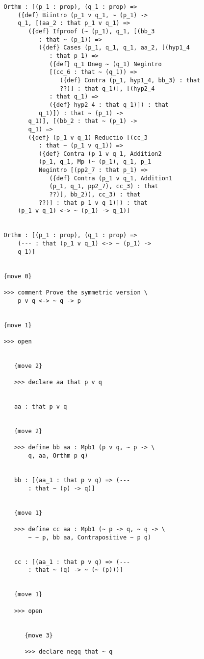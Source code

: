 \documentclass[12pt]{article}
\begin{document}
\begin{verbatim}
   Orthm : [(p_1 : prop), (q_1 : prop) => 
       ({def} Biintro (p_1 v q_1, ~ (p_1) -> 
       q_1, [(aa_2 : that p_1 v q_1) => 
          ({def} Ifproof (~ (p_1), q_1, [(bb_3 
             : that ~ (p_1)) => 
             ({def} Cases (p_1, q_1, q_1, aa_2, [(hyp1_4 
                : that p_1) => 
                ({def} q_1 Dneg ~ (q_1) Negintro 
                [(cc_6 : that ~ (q_1)) => 
                   ({def} Contra (p_1, hyp1_4, bb_3) : that 
                   ??)] : that q_1)], [(hyp2_4 
                : that q_1) => 
                ({def} hyp2_4 : that q_1)]) : that 
             q_1)]) : that ~ (p_1) -> 
          q_1)], [(bb_2 : that ~ (p_1) -> 
          q_1) => 
          ({def} (p_1 v q_1) Reductio [(cc_3 
             : that ~ (p_1 v q_1)) => 
             ({def} Contra (p_1 v q_1, Addition2 
             (p_1, q_1, Mp (~ (p_1), q_1, p_1 
             Negintro [(pp2_7 : that p_1) => 
                ({def} Contra (p_1 v q_1, Addition1 
                (p_1, q_1, pp2_7), cc_3) : that 
                ??)], bb_2)), cc_3) : that 
             ??)] : that p_1 v q_1)]) : that 
       (p_1 v q_1) <-> ~ (p_1) -> q_1)]


   Orthm : [(p_1 : prop), (q_1 : prop) => 
       (--- : that (p_1 v q_1) <-> ~ (p_1) -> 
       q_1)]


   {move 0}

   >>> comment Prove the symmetric version \
       p v q <-> ~ q -> p


   {move 1}

   >>> open


      {move 2}

      >>> declare aa that p v q


      aa : that p v q


      {move 2}

      >>> define bb aa : Mpb1 (p v q, ~ p -> \
          q, aa, Orthm p q)


      bb : [(aa_1 : that p v q) => (--- 
          : that ~ (p) -> q)]


      {move 1}

      >>> define cc aa : Mpb1 (~ p -> q, ~ q -> \
          ~ ~ p, bb aa, Contrapositive ~ p q)


      cc : [(aa_1 : that p v q) => (--- 
          : that ~ (q) -> ~ (~ (p)))]


      {move 1}

      >>> open


         {move 3}

         >>> declare negq that ~ q



\end{verbatim}
\end{document}
